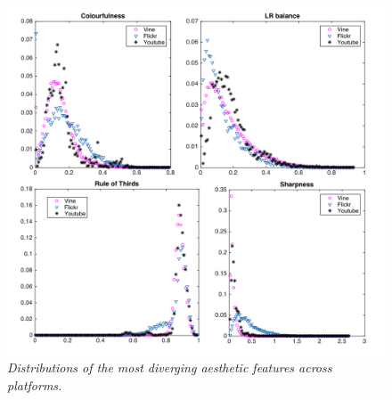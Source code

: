 \begin{figure}[!htb]
\centering
\includegraphics[width=\columnwidth]{plots/comparison/aesthetics}
\caption{\textsl{ Distributions of the most diverging aesthetic features across platforms.}}
\label{fig:comparison_aesthetics}
\end{figure}

